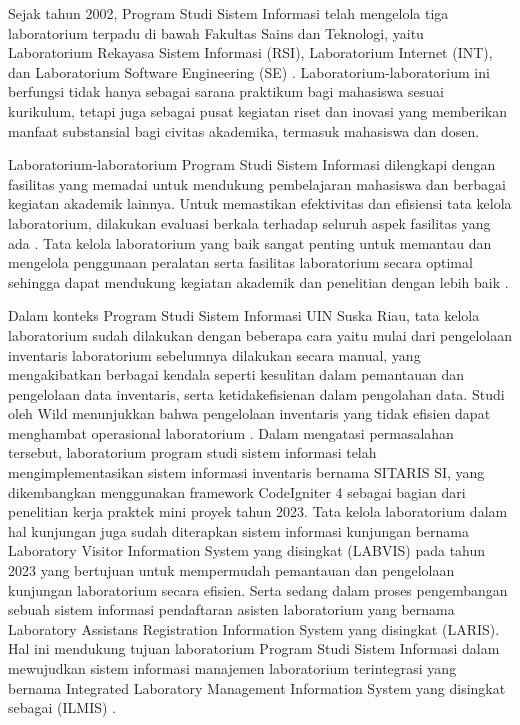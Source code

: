 Sejak tahun 2002, Program Studi Sistem Informasi telah mengelola tiga laboratorium terpadu di bawah Fakultas Sains dan Teknologi, yaitu Laboratorium Rekayasa Sistem Informasi (RSI), Laboratorium Internet (INT), dan Laboratorium Software Engineering (SE) \cite{lab-si-website}. Laboratorium-laboratorium ini berfungsi tidak hanya sebagai sarana praktikum bagi mahasiswa sesuai kurikulum, tetapi juga sebagai pusat kegiatan riset dan inovasi yang memberikan manfaat substansial bagi civitas akademika, termasuk mahasiswa dan dosen.

Laboratorium-laboratorium Program Studi Sistem Informasi dilengkapi dengan fasilitas yang memadai untuk mendukung pembelajaran mahasiswa dan berbagai kegiatan akademik lainnya. Untuk memastikan efektivitas dan efisiensi tata kelola laboratorium, dilakukan evaluasi berkala terhadap seluruh aspek fasilitas yang ada \cite{lab-si-website}. Tata kelola laboratorium yang baik sangat penting untuk memantau dan mengelola penggunaan peralatan serta fasilitas laboratorium secara optimal sehingga dapat mendukung kegiatan akademik dan penelitian dengan lebih baik \cite{dongapure_a__c___2024}.

Dalam konteks Program Studi Sistem Informasi UIN Suska Riau, tata kelola laboratorium sudah dilakukan dengan beberapa cara yaitu mulai dari pengelolaan inventaris laboratorium sebelumnya dilakukan secara manual, yang mengakibatkan berbagai kendala seperti kesulitan dalam pemantauan dan pengelolaan data inventaris, serta ketidakefisienan dalam pengolahan data. Studi oleh Wild \citeyear{smith2021agile} menunjukkan bahwa pengelolaan inventaris yang tidak efisien dapat menghambat operasional laboratorium \cite{wild2017best}. Dalam mengatasi permasalahan tersebut, laboratorium program studi sistem informasi telah mengimplementasikan sistem informasi inventaris bernama SITARIS SI, yang dikembangkan menggunakan framework CodeIgniter 4 sebagai bagian dari penelitian kerja praktek mini proyek tahun 2023. Tata kelola laboratorium dalam hal kunjungan juga sudah diterapkan sistem informasi kunjungan bernama Laboratory Visitor Information System yang disingkat (LABVIS) pada tahun 2023 yang bertujuan untuk mempermudah pemantauan dan pengelolaan kunjungan laboratorium secara efisien. Serta sedang dalam proses pengembangan sebuah sistem informasi pendaftaran asisten laboratorium yang bernama Laboratory Assistans Registration Information System yang disingkat (LARIS). Hal ini mendukung tujuan laboratorium Program Studi Sistem Informasi dalam mewujudkan sistem informasi manajemen laboratorium terintegrasi yang bernama Integrated Laboratory Management Information System yang disingkat sebagai (ILMIS) \cite{lab-si-website}.

